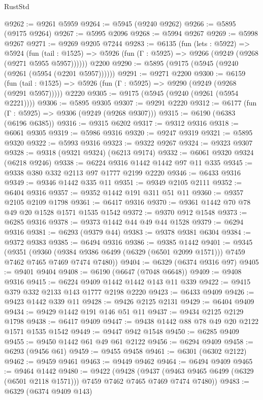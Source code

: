 \begin{lexlean}{RustStd}
\begin{coremodule}
{\begin{coremodule}
{{{{{{{{{{{{{{{{{{{{{{{{{{{{{{{{{{{@9262 := @9261 @5959
@9264 := @5945 (@9240 @9262)
@9266 := @5895 (@9175 @9264)
@9267 := @5995 @2096
@9268 := @5994 @9267
@9269 := @5998 @9267
@9271 := @9269 @9205 @7244
@9283 := @6135
    (fun (lets : @5922) =>
    @5924
      (fun (tail : @1525) => @5926 (fun (Γ : @5925) => @9266 (@9249 (@9268 (@9271 @5955 @5957))))))
    @2200
@9290 := @5895 (@9175 (@5945 (@9240 (@9261 (@5954 (@2201 @5957))))))
@9291 := @9271 @2200
@9300 := @6159
    (fun (tail : @1525) => @5926 (fun (Γ : @5925) => @9290 (@9249 (@9268 (@9291 @5957)))))
    @2220
@9305 := @9175 (@5945 (@9240 (@9261 (@5954 @2221))))
@9306 := @5895 @9305
@9307 := @9291 @2220
@9312 := @6177 (fun (Γ : @5925) => @9306 (@9249 (@9268 @9307)))
@9315 := @6190 (@6383 (@6196 @6385))
@9316 := @9315 @6202
@9317 := @9312 @9316
@9318 := @6061 @9305
@9319 := @5986 @9316
@9320 := @9247 @9319
@9321 := @5895 @9320
@9322 := @5993 @9316
@9323 := @9322 @9267
@9324 := @9323 @9307
@9328 := @9318 (@9321 @9324) (@6213 @9174)
@9332 := @6061 @9320 @9324 (@6218 @9246)
@9338 := @6224 @9316 @1442 @1442 @97 @11 @335
@9345 := @9338 @380 @332 @2113 @97 @1777 @2199 @2220
@9346 := @6433 @9316
@9349 := @9346 @1442 @335 @11
@9351 := @9349 @2105 @2111
@9352 := @6404 @9316
@9357 := @9352 @1442 @191 @311 @51 @11
@9360 := @9357 @2105 @2109 @1798
@9361 := @6417 @9316
@9370 := @9361 @1442 @70 @78 @49 @20 @1528 @1571 @1535 @1542
@9372 := @9370 @912 @1548
@9373 := @6285 @9316
@9378 := @9373 @1442 @44 @49 @44 @1528
@9379 := @6294 @9316
@9381 := @6293 (@9379 @44)
@9383 := @9378 @9381 @6304
@9384 := @9372 @9383
@9385 := @6494 @9316
@9386 := @9385 @1442
@9401 := @9345
    (@9351
      (@9360 (@9384 @9386 @6499 (@6329 (@6501 @2099 @1571))) @7459 @7462 @7465 @7469 @7474 @7480))
@9404 := @6329 (@6374 @9316 @97)
@9405 := @9401 @9404
@9408 := @6190 (@6647 (@7048 @6648))
@9409 := @9408 @9316
@9415 := @6224 @9409 @1442 @1442 @143 @11 @339
@9422 := @9415 @379 @332 @2133 @143 @1777 @2198 @2220
@9423 := @6433 @9409
@9426 := @9423 @1442 @339 @11
@9428 := @9426 @2125 @2131
@9429 := @6404 @9409
@9434 := @9429 @1442 @191 @146 @51 @11
@9437 := @9434 @2125 @2129 @1798
@9438 := @6417 @9409
@9447 := @9438 @1442 @88 @78 @49 @20 @2122 @1571 @1535 @1542
@9449 := @9447 @942 @1548
@9450 := @6285 @9409
@9455 := @9450 @1442 @61 @49 @61 @2122
@9456 := @6294 @9409
@9458 := @6293 (@9456 @61)
@9459 := @9455 @9458
@9461 := @6301 (@6302 @2122)
@9462 := @9459 @9461
@9463 := @9449 @9462
@9464 := @6494 @9409
@9465 := @9464 @1442
@9480 := @9422
    (@9428
      (@9437 (@9463 @9465 @6499 (@6329 (@6501 @2118 @1571))) @7459 @7462 @7465 @7469 @7474 @7480))
@9483 := @6329 (@6374 @9409 @143)
}}}}}}}}}}}}}}}}}}}}}}}}}}}}}}}}}}}
\end{coremodule}}
\end{coremodule}
\end{lexlean}
